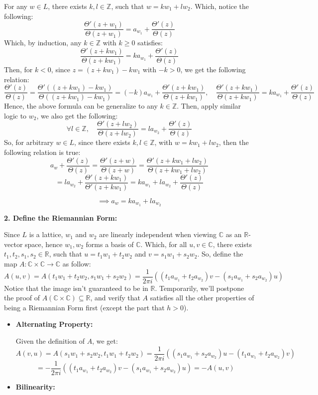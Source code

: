 \documentclass{article}
\begin{document}
\begin{itemize}
    For any $w\in L$, there exists $k,l\in\mathbb{Z}$, such that $w=kw_1+lw_2$. Which, notice the following:
    $$\frac{\Theta'(z+w_1)}{\Theta(z+w_1)}=a_{w_1}+\frac{\Theta'(z)}{\Theta(z)}$$
    Which, by induction, any $k\in\mathbb{Z}$ with $k\geq 0$ satisfies:
    $$\frac{\Theta'(z+kw_1)}{\Theta(z+kw_1)}=ka_{w_1}+\frac{\Theta'(z)}{\Theta(z)}$$
    Then, for $k<0$, since $z=(z+kw_1)-kw_1$ with $-k>0$, we get the following relation:
    $$\frac{\Theta'(z)}{\Theta(z)}=\frac{\Theta'((z+kw_1)-kw_1)}{\Theta((z+kw_1)-kw_1)} = (-k)a_{w_1}+\frac{\Theta'(z+kw_1)}{\Theta(z+kw_1)},\quad \frac{\Theta'(z+kw_1)}{\Theta(z+kw_1)} = ka_{w_1}+\frac{\Theta'(z)}{\Theta(z)}$$
    Hence, the above formula can be generalize to any $k\in\mathbb{Z}$. Then, apply similar logic to $w_2$, we also get the following:
    $$\forall l\in\mathbb{Z},\quad \frac{\Theta'(z+lw_2)}{\Theta(z+lw_2)} = la_{w_2}+\frac{\Theta'(z)}{\Theta(z)}$$
    So, for arbitrary $w\in L$, since there exists $k,l\in\mathbb{Z}$, with $w=kw_1+lw_2$, then the following relation is true:
    $$a_w+\frac{\Theta'(z)}{\Theta(z)}=\frac{\Theta'(z+w)}{\Theta(z+w)} = \frac{\Theta'(z+kw_1+lw_2)}{\Theta(z+kw_1+lw_2)}$$
    $$ = la_{w_2}+\frac{\Theta'(z+kw_1)}{\Theta'(z+kw_1)} = ka_{w_1}+la_{w_2}+\frac{\Theta'(z)}{\Theta(z)}$$
    
    $$\implies a_w = ka_{w_1}+la_{w_2}$$

    \hfil

    \textbf{2. Define the Riemannian Form:}

    Since $L$ is a lattice, $w_1$ and $w_2$ are linearly independent when viewing $\mathbb{C}$ as an $\mathbb{R}$-vector space, hence $w_1,w_2$ forms a basis of $\mathbb{C}$. Which, for all $u,v\in\mathbb{C}$, there exists $t_1,t_2,s_1,s_2\in\mathbb{R}$, such that $u=t_1w_1+t_2w_2$ and $v=s_1w_1+s_2w_2$. So, define the map $A:\mathbb{C}\times\mathbb{C}\rightarrow\mathbb{C}$ as follow:
    $$A(u,v) = A(t_1w_1+t_2w_2,s_1w_1+s_2w_2) = \frac{1}{2\pi i}((t_1a_{w_1}+t_2a_{w_2})v - (s_1a_{w_1}+s_2a_{w_2})u)$$
    Notice that the image isn't guaranteed to be in $\mathbb{R}$. Temporarily, we'll postpone the proof of $A(\mathbb{C}\times \mathbb{C})\subseteq \mathbb{R}$, and verify that $A$ satisfies all the other properties of being a Riemannian Form first (except the part that $h>0$).
    \begin{itemize}
        \item \textbf{Alternating Property:}
        
        Given the definition of $A$, we get:
        $$A(v,u)=A(s_1w_1+s_2w_2,t_1w_1+t_2w_2) = \frac{1}{2\pi i}((s_1a_{w_1}+s_2a_{w_2})u-(t_1a_{w_1}+t_2a_{w_2})v)$$
        $$ = -\frac{1}{2\pi i}((t_1a_{w_1}+t_2a_{w_2})v-(s_1a_{w_1}+s_2a_{w_2})u) = -A(u,v)$$
        \item \textbf{Bilinearity:}
        

\end{itemize}
\end{itemize}
\end{document}
